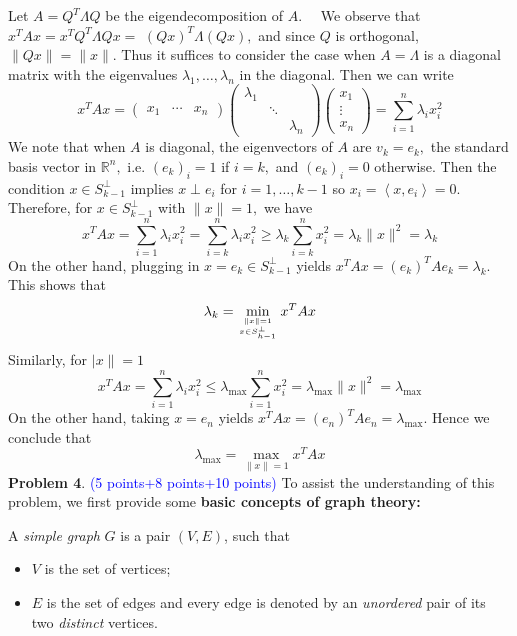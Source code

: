 \documentclass[english,onecolumn]{IEEEtran}
\begin{document}
Let $A=Q^{T} \Lambda Q$ be the eigendecomposition of $A . \quad$ We observe that $x^{T} A x=x^{T} Q^{T} \Lambda Q x=$ $(Q x)^{T} \Lambda(Q x),$ and since $Q$ is orthogonal, $\|Q x\|=\|x\| .$ Thus it suffices to consider the case when $A=\Lambda$ is a diagonal matrix with the eigenvalues $\lambda_{1}, \ldots, \lambda_{n}$ in the diagonal. Then we can write
$$
x^{T} A x=\left(\begin{array}{lll}
	x_{1} & \cdots & x_{n}
\end{array}\right)\left(\begin{array}{lll}
	\lambda_{1} & & \\
	& \ddots & \\
	& & \lambda_{n}
\end{array}\right)\left(\begin{array}{c}
	x_{1} \\
	\vdots \\
	x_{n}
\end{array}\right)=\sum_{i=1}^{n} \lambda_{i} x_{i}^{2}
$$
We note that when $A$ is diagonal, the eigenvectors of $A$ are $v_{k}=e_{k},$ the standard basis vector in $\mathbb{R}^{n},$ i.e. $\left(e_{k}\right)_{i}=1$ if $i=k,$ and $\left(e_{k}\right)_{i}=0$ otherwise. Then the condition $x \in S_{k-1}^{\perp}$ implies $x \perp e_{i}$ for $i=1, \ldots, k-1$ so $x_{i}=\left\langle x, e_{i}\right\rangle=0 .$ Therefore, for $x \in S_{k-1}^{\perp}$ with $\|x\|=1,$ we have
$$
x^{T} A x=\sum_{i=1}^{n} \lambda_{i} x_{i}^{2}=\sum_{i=k}^{n} \lambda_{i} x_{i}^{2} \geq \lambda_{k} \sum_{i=k}^{n} x_{i}^{2}=\lambda_{k}\|x\|^{2}=\lambda_{k}
$$
On the other hand, plugging in $x=e_{k} \in S_{k-1}^{\perp}$ yields $x^{T} A x=\left(e_{k}\right)^{T} A e_{k}=\lambda_{k} .$ This shows that
$$
\lambda_{k}=\min _{\|x\|=1 \atop x \in S_{h-1}^{\perp}} x^{T} A x
$$
Similarly, for $\mid x \|=1$
$$
x^{T} A x=\sum_{i=1}^{n} \lambda_{i} x_{i}^{2} \leq \lambda_{\max } \sum_{i=1}^{n} x_{i}^{2}=\lambda_{\max }\|x\|^{2}=\lambda_{\max }
$$
On the other hand, taking $x=e_{n}$ yields $x^{T} A x=\left(e_{n}\right)^{T} A e_{n}=\lambda_{\max } .$ Hence we conclude that
$$
\lambda_{\max }=\max _{\|x\|=1} x^{T} A x
$$
\newpage
\noindent\textbf{Problem 4}. \textcolor{blue}{(5 points+8 points+10 points)}
\noindent To assist the understanding of this problem, we first provide some \textbf{basic concepts of graph theory:}
 
 A \textit{simple graph} $G$ is a pair $(V,E)$, such that
\begin{itemize}
	\item 
	$V$ is the set of vertices;
	
	\item 
	$E$ is the set of edges and every edge is denoted by an \textit{unordered} pair of its two \textit{distinct} vertices.
\end{itemize}
\end{document}
